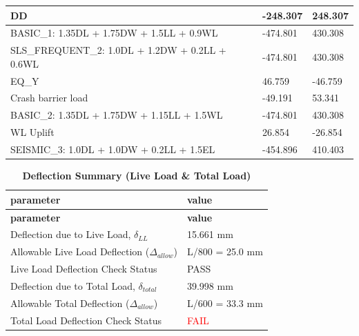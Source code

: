 \documentclass[12pt,a4paper]{report}
\numberwithin{table}{chapter}
\numberwithin{figure}{chapter}
\begin{document}
\begin{longtable}{|L{6.0cm}|C{4.0cm}|C{4.0cm}|}
\hline
DD & -248.307 & 248.307 \\[6pt]
\hline
BASIC\_\allowbreak{}1:\allowbreak{} 1.35DL + 1.75DW + 1.5LL + 0.9WL & -474.801 & 430.308 \\[6pt]
\hline
SLS\_\allowbreak{}FREQUENT\_\allowbreak{}2:\allowbreak{} 1.0DL + 1.2DW + 0.2LL + 0.6WL & -474.801 & 430.308 \\[6pt]
\hline
EQ\_\allowbreak{}Y & 46.759 & -46.759 \\[6pt]
\hline
Crash barrier load & -49.191 & 53.341 \\[6pt]
\hline
BASIC\_\allowbreak{}2:\allowbreak{} 1.35DL + 1.75DW + 1.15LL + 1.5WL & -474.801 & 430.308 \\[6pt]
\hline
WL Uplift & 26.854 & -26.854 \\[6pt]
\hline
SEISMIC\_\allowbreak{}3:\allowbreak{} 1.0DL + 1.0DW + 0.2LL + 1.5EL & -454.896 & 410.403 \\[6pt]
\hline
\end{longtable}


\vspace{1em}
\begin{longtable}{|L{7cm}|p{8.5cm}|}
\caption{\textbf{Deflection Summary (Live Load \& Total Load)}}\\
\hline
\textbf{parameter} & \textbf{value} \\
\hline
\endfirsthead

\hline
\textbf{parameter} & \textbf{value} \\
\hline
\endhead
\hline
\endlastfoot
\textnormal{Deflection due to Live Load, $\delta_{LL}$} & 15.661 mm \\[6pt]
\hline
\textnormal{Allowable Live Load Deflection ($\Delta_{allow}$)} & L/800 = 25.0 mm \\[6pt]
\hline
\textnormal{Live Load Deflection Check Status} & PASS \\[6pt]
\hline
\textnormal{Deflection due to Total Load, $\delta_{total}$} & 39.998 mm \\[6pt]
\hline
\textnormal{Allowable Total Deflection ($\Delta_{allow}$)} & L/600 = 33.3 mm \\[6pt]
\hline
\textnormal{Total Load Deflection Check Status} & \textcolor{red}{FAIL} \\[6pt]
\end{longtable}
\end{document}
